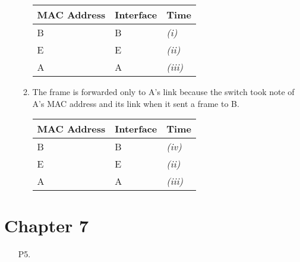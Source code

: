 \documentclass{article}
\begin{document}
\begin{enumerate}
\begin{enumerate}[label=\textit{(\roman*)}]
        \begin{tabular}{@{}lll@{}}
            \toprule
            MAC Address & Interface & Time \\ \midrule
            B & B & \textit{(i)} \\
            E & E & \textit{(ii)} \\
            A & A & \textit{(iii)} \\ \bottomrule
        \end{tabular}

        \item The frame is forwarded only to A's link because the switch took note of A's MAC address and its link when it sent a frame to B.
        
        \begin{tabular}{@{}lll@{}}
            \toprule
            MAC Address & Interface & Time \\ \midrule
            B & B & \textit{(iv)} \\
            E & E & \textit{(ii)} \\
            A & A & \textit{(iii)} \\ \bottomrule
        \end{tabular}
    \end{enumerate}
\end{enumerate}

\section*{Chapter 7}

\begin{enumerate}
    \item[P5.] 
\end{enumerate}
\end{document}
